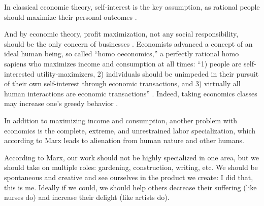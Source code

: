 \documentclass[10pt, letterpaper]{article}
\begin{document}
\begin{spacing}{1.8}
In classical economic theory, self-interest is the key assumption, as rational people should maximize their personal outcomes \citep{seuntjens15b}.%

And by economic theory, profit maximization, not any social responsibility, should be the only concern of businesses \cite{friedman70}.
Economists advanced a concept of an ideal human being, so called ``homo oeconomics,'' a perfectly rational
homo sapiens who maximizes income and consumption at all times: %
``1) people are self-interested utility-maximizers, 2)
individuals should be unimpeded in their pursuit of their own self-interest
through economic transactions, and 3) virtually all human interactions are
economic transactions'' %
\citep[][p. 273]{walker1992greed}.
%
 Indeed, taking economics classes may increase one's greedy behavior \citep{wang11b}.

In addition to maximizing income and consumption, another problem with economics
is the complete, extreme, and unrestrained labor specialization, which according to Marx leads to alienation from human nature
and other humans.

According to Marx, our work should not be highly specialized in one area, but we should take on
multiple roles: gardening, construction, writing, etc. We should be spontaneous and creative and see ourselves in the product we create: I did that, this is
me. %
Ideally if we could, we should help others decrease their suffering (like nurses do) and increase their delight (like artists do). 


\end{spacing}
\end{document}
